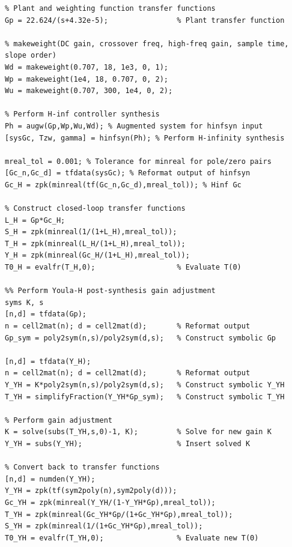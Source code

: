 \documentclass[journal,article,submit,pdftex,moreauthors]{Definitions/mdpi}
\begin{document}
\begin{lstlisting}[style=Matlab-editor, basicstyle=\small\ttfamily]
%% H-infinity controller implementation
% Plant and weighting function transfer functions
Gp = 22.624/(s+4.32e-5);                % Plant transfer function

% makeweight(DC gain, crossover freq, high-freq gain, sample time, slope order)
Wd = makeweight(0.707, 18, 1e3, 0, 1);  
Wp = makeweight(1e4, 18, 0.707, 0, 2);  
Wu = makeweight(0.707, 300, 1e4, 0, 2);

% Perform H-inf controller synthesis
Ph = augw(Gp,Wp,Wu,Wd); % Augmented system for hinfsyn input
[sysGc, Tzw, gamma] = hinfsyn(Ph); % Perform H-infinity synthesis

mreal_tol = 0.001; % Tolerance for minreal for pole/zero pairs
[Gc_n,Gc_d] = tfdata(sysGc); % Reformat output of hinfsyn
Gc_H = zpk(minreal(tf(Gc_n,Gc_d),mreal_tol)); % Hinf Gc

% Construct closed-loop transfer functions
L_H = Gp*Gc_H;
S_H = zpk(minreal(1/(1+L_H),mreal_tol));
T_H = zpk(minreal(L_H/(1+L_H),mreal_tol));
Y_H = zpk(minreal(Gc_H/(1+L_H),mreal_tol));
T0_H = evalfr(T_H,0);                   % Evaluate T(0)

%% Perform Youla-H post-synthesis gain adjustment
syms K, s
[n,d] = tfdata(Gp);
n = cell2mat(n); d = cell2mat(d);       % Reformat output
Gp_sym = poly2sym(n,s)/poly2sym(d,s);   % Construct symbolic Gp

[n,d] = tfdata(Y_H); 
n = cell2mat(n); d = cell2mat(d);       % Reformat output
Y_YH = K*poly2sym(n,s)/poly2sym(d,s);   % Construct symbolic Y_YH
T_YH = simplifyFraction(Y_YH*Gp_sym);   % Construct symbolic T_YH

% Perform gain adjustment
K = solve(subs(T_YH,s,0)-1, K);         % Solve for new gain K
Y_YH = subs(Y_YH);                      % Insert solved K

% Convert back to transfer functions
[n,d] = numden(Y_YH);
Y_YH = zpk(tf(sym2poly(n),sym2poly(d)));
Gc_YH = zpk(minreal(Y_YH/(1-Y_YH*Gp),mreal_tol)); 
T_YH = zpk(minreal(Gc_YH*Gp/(1+Gc_YH*Gp),mreal_tol));
S_YH = zpk(minreal(1/(1+Gc_YH*Gp),mreal_tol));    
T0_YH = evalfr(T_YH,0);                 % Evaluate new T(0)

\end{lstlisting}
\end{document}
